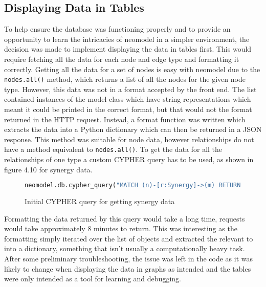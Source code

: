 \subsection{Displaying Data in Tables}
To help ensure the database was functioning properly and to provide an opportunity to learn the intricacies of neomodel in a simpler 
environment, the decision was made to implement displaying the data in tables first. This would require fetching all the data for each 
node and edge type and formatting it correctly. Getting all the data for a set of nodes is easy with neomodel due to the \verb|nodes.all()| method, 
which returns a list of all the nodes for the given node type. However, this data was not in a format accepted by the front end. The list contained 
instances of the model class which have string representations which meant it could be printed in the correct format, but that would not the format 
returned in the HTTP request. Instead, a format function was written which extracts the data into a Python dictionary which can then be returned in a JSON response.
This method was suitable for node data, however relationships do not have a method equivalent to \verb|nodes.all()|. To get the data 
for all the relationships of one type a custom CYPHER query has to be used, as shown in figure 4.10 for synergy data.
\begin{figure}[!htbp]
    \begin{lstlisting}[language=Python]
        neomodel.db.cypher_query("MATCH (n)-[r:Synergy]->(m) RETURN n, r, m")
    \end{lstlisting}
    \caption{Initial CYPHER query for getting synergy data}
\end{figure}
Formatting the data returned by this query would take a long time, requests would take approximately 8 minutes to return.
This was interesting as the formatting simply iterated over the list of objects and extracted the relevant to into a dictionary, something that 
isn't usually a computationally heavy task. After some preliminary troubleshooting, the issue was left in the code as it was likely to change 
when displaying the data in graphs as intended and the tables were only intended as a tool for learning and debugging.

